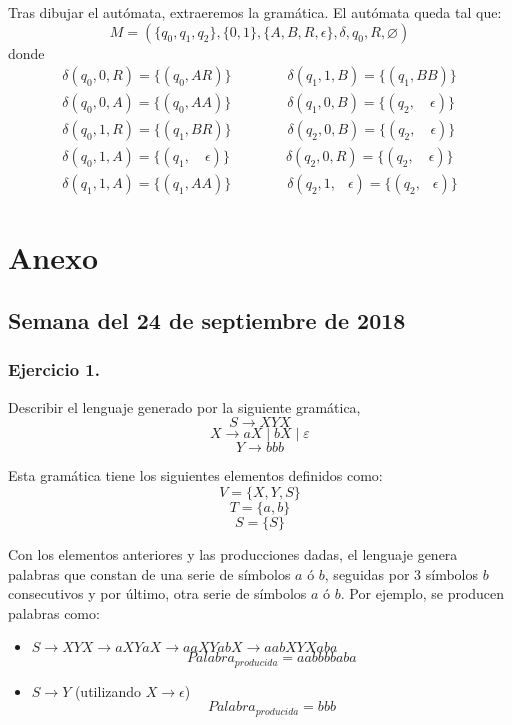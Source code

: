\documentclass[11pt,a4paper]{article}
\begin{document}
Tras dibujar el autómata, extraeremos la gramática. El autómata queda tal que:
\[M=(\{q_0,q_1,q_2\},\{0,1\},\{A,B,R,\epsilon\},\delta,q_0,R,\varnothing)\]
donde
	\[\begin{array}{c}
		\delta(q_0,0,R)=\{(q_0,AR)\} \qquad \qquad \delta(q_1,1,B)=\{(q_1,BB)\}\\
		\delta(q_0,0,A)=\{(q_0,AA)\} \qquad \qquad \delta(q_1,0,B)=\{(q_2, \quad \epsilon)\}\\
		\delta(q_0,1,R)=\{(q_1,BR)\} \qquad \qquad \delta(q_2,0,B)=\{(q_2, \quad \epsilon)\}\\
		\delta(q_0,1,A)=\{(q_1, \quad \epsilon)\} \qquad \qquad \delta(q_2,0,R)=\{(q_2, \quad \epsilon)\}\\
		\delta(q_1,1,A)=\{(q_1,AA)\} \qquad \qquad \delta(q_2,1,\; \; \: \epsilon)=\{(q_2,\; \; \:\epsilon)\}
	\end{array}\]

\newpage

\section{Anexo}
\subsection{Semana del 24 de septiembre de 2018}

\subsubsection{Ejercicio 1.} Describir el lenguaje generado por la siguiente gramática,\\
	\[S\rightarrow XYX \]
	\[X\rightarrow aX \mid bX \mid \varepsilon\]
	\[Y\rightarrow bbb\]
	
Esta gramática tiene los siguientes elementos definidos como:
	\[V=\{X,Y,S\}\]
	\[T=\{a,b\}\]
	\[S=\{S\}\]
	
Con los elementos anteriores y las producciones dadas, el lenguaje genera palabras que constan de una serie de símbolos $a$ ó $b$, seguidas por 3 símbolos $b$ consecutivos y por último, otra serie de símbolos $a$ ó $b$. Por ejemplo, se producen palabras como:

	\begin{itemize}
	\item $S\rightarrow XYX\rightarrow aXYaX\rightarrow aaXYabX \rightarrow aabXYXaba$
	\[Palabra_{producida}=aabbbbaba\]
	\item $S\rightarrow Y$ (utilizando $X\rightarrow \epsilon$)
	\[Palabra_{producida}=bbb\]
	\end{itemize}
	
\end{document}
